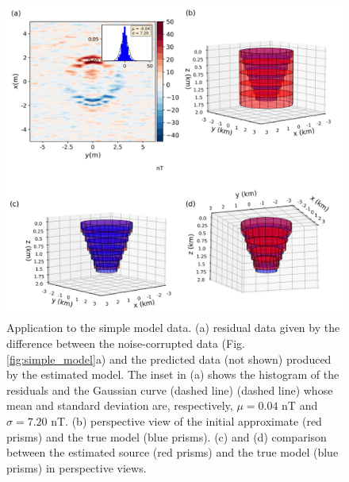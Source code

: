 \begin{figure}
	\centering
	\includegraphics[scale=.5]{figures/simple_results.png}
	\caption{Application to the simple model data. (a) residual data given by the difference between the noise-corrupted data (Fig. \ref{fig:simple_model}a) and the predicted data (not shown) produced by the estimated model. The inset in (a) shows the histogram of the residuals and the Gaussian curve (dashed line) (dashed line) whose mean and standard deviation are, respectively, $\mu = 0.04$ nT and $\sigma=7.20$ nT. (b) perspective view of the initial approximate (red prisms) and the true model (blue prisms). (c) and (d) comparison between the estimated source (red prisms) and the true model (blue prisms) in perspective views.}
	\label{fig:simple_results}
\end{figure}


